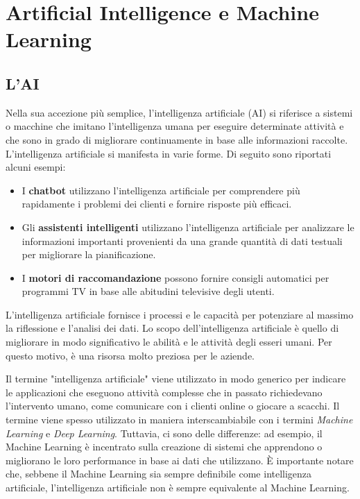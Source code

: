 \graphicspath{ {img/2/} }
\chapter{Artificial Intelligence e Machine Learning}\label{cap:CenniAIeML}
\thispagestyle{empty} %
\newpage

\section{L'\acf{AI}}
\vspace{8mm}
Nella sua accezione più semplice, l'intelligenza artificiale (AI) si riferisce a sistemi o macchine che imitano l'intelligenza umana per eseguire determinate attività e che sono in grado di migliorare continuamente in base alle informazioni raccolte. L'intelligenza artificiale si manifesta in varie forme. Di seguito sono riportati alcuni esempi:

\begin{itemize}
    \item I \textbf{chatbot} utilizzano l'intelligenza artificiale per comprendere più rapidamente i problemi dei clienti e fornire risposte più efficaci. 
    \item Gli \textbf{assistenti intelligenti} utilizzano l'intelligenza artificiale per analizzare le informazioni importanti provenienti da una grande quantità di dati testuali per migliorare la pianificazione.
    \item I \textbf{motori di raccomandazione} possono fornire consigli automatici per programmi TV in base alle abitudini televisive degli utenti.
\end{itemize}

L'intelligenza artificiale fornisce i processi e le capacità per potenziare al massimo la riflessione e l'analisi dei dati. Lo scopo dell'intelligenza artificiale è quello di migliorare in modo significativo le abilità e le attività degli esseri umani. Per questo motivo, è una risorsa molto preziosa per le aziende.

Il termine "intelligenza artificiale" viene utilizzato in modo generico per indicare le applicazioni che eseguono attività complesse che in passato richiedevano l'intervento umano, come comunicare con i clienti online o giocare a scacchi. Il termine viene spesso utilizzato in maniera interscambiabile con i termini \emph{Machine Learning} e \emph{Deep Learning}. Tuttavia, ci sono delle differenze: ad esempio, il Machine Learning è incentrato sulla creazione di sistemi che apprendono o migliorano le loro performance in base ai dati che utilizzano. È importante notare che, sebbene il Machine Learning sia sempre definibile come intelligenza artificiale, l'intelligenza artificiale non è sempre equivalente al Machine Learning.

